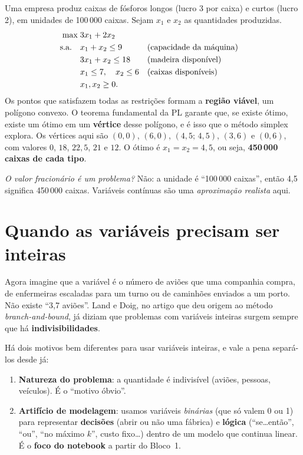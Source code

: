 \begin{exemplo}
Uma empresa produz caixas de fósforos longos (lucro 3 por caixa) e curtos (lucro 2), em unidades de 100\,000 caixas.
Sejam $x_1$ e $x_2$ as quantidades produzidas.
\[
\begin{aligned}
\max\;& 3x_1 + 2x_2\\
\text{s.a.}\quad & x_1 + x_2 \le 9 &&\text{(capacidade da máquina)}\\
    & 3x_1 + x_2 \le 18 &&\text{(madeira disponível)}\\
    & x_1 \le 7,\quad x_2 \le 6 &&\text{(caixas disponíveis)}\\
    & x_1, x_2 \ge 0.
\end{aligned}
\]
Os pontos que satisfazem todas as restrições formam a \textbf{região viável}, um polígono convexo. O teorema
fundamental da PL garante que, se existe ótimo, existe um ótimo em um \textbf{vértice} desse polígono, e é isso que o
método simplex explora. Os vértices aqui são $(0,0)$, $(6,0)$, $(4{,}5;\,4{,}5)$, $(3,6)$ e $(0,6)$, com valores
$0$, $18$, $22{,}5$, $21$ e $12$. O ótimo é $x_1=x_2=4{,}5$, ou seja, \textbf{450\,000 caixas de cada tipo}.

\emph{O valor fracionário é um problema?} Não: a unidade é ``100\,000 caixas'', então 4,5 significa 450\,000
caixas. Variáveis contínuas são uma \emph{aproximação realista} aqui.
\end{exemplo}

\section{Quando as variáveis precisam ser inteiras}

Agora imagine que a variável é o número de aviões que uma companhia compra, de enfermeiras escaladas para um turno ou
de caminhões enviados a um porto. Não existe ``3,7 aviões''. Land e Doig, no artigo que deu origem ao método
\emph{branch-and-bound}, já diziam que problemas com variáveis inteiras surgem sempre que há
\textbf{indivisibilidades}.

Há dois motivos bem diferentes para usar variáveis inteiras, e vale a pena separá-los desde já:
\begin{enumerate}
  \item \textbf{Natureza do problema}: a quantidade é indivisível (aviões, pessoas, veículos). É o
  ``motivo óbvio''.
  \item \textbf{Artifício de modelagem}: usamos variáveis \emph{binárias} (que só valem 0 ou 1) para representar
  \textbf{decisões} (abrir ou não uma fábrica) e \textbf{lógica} (``se\ldots então'', ``ou'', ``no máximo $k$'',
  custo fixo\ldots) dentro de um modelo que continua linear. É o \textbf{foco do notebook} a partir do Bloco~1.
\end{enumerate}

